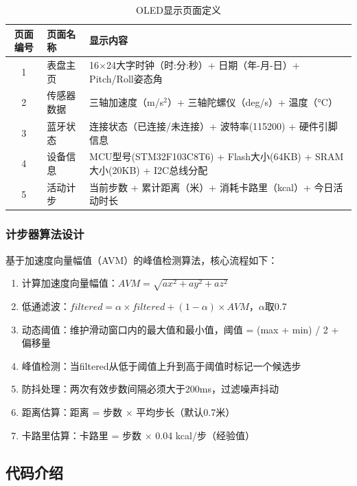 \begin{table}[h]
    \centering
    \caption{OLED显示页面定义}
    \label{tab:pages}
    \begin{tabular}{|c|l|l|}
        \hline
        \textbf{页面编号} & \textbf{页面名称} & \textbf{显示内容} \\ \hline
        1 & 表盘主页 & 16$\times$24大字时钟（时:分:秒）+ 日期（年-月-日）+ Pitch/Roll姿态角 \\ \hline
        2 & 传感器数据 & 三轴加速度（m/s$^2$）+ 三轴陀螺仪（deg/s）+ 温度（°C） \\ \hline
        3 & 蓝牙状态 & 连接状态（已连接/未连接）+ 波特率(115200) + 硬件引脚信息 \\ \hline
        4 & 设备信息 & MCU型号(STM32F103C8T6) + Flash大小(64KB) + SRAM大小(20KB) + I2C总线分配 \\ \hline
        5 & 活动计步 & 当前步数 + 累计距离（米）+ 消耗卡路里（kcal）+ 今日活动时长 \\ \hline
    \end{tabular}
\end{table}

\subsubsection{计步器算法设计}
基于加速度向量幅值（AVM）的峰值检测算法，核心流程如下：
\begin{enumerate}
    \item 计算加速度向量幅值：$AVM = \sqrt{ax^2 + ay^2 + az^2}$
    \item 低通滤波：$filtered = \alpha \times filtered + (1-\alpha) \times AVM$，$\alpha$取0.7
    \item 动态阈值：维护滑动窗口内的最大值和最小值，阈值 = (max + min) / 2 + 偏移量
    \item 峰值检测：当filtered从低于阈值上升到高于阈值时标记一个候选步
    \item 防抖处理：两次有效步数间隔必须大于200ms，过滤噪声抖动
    \item 距离估算：距离 = 步数 $\times$ 平均步长（默认0.7米）
    \item 卡路里估算：卡路里 = 步数 $\times$ 0.04 kcal/步（经验值）
\end{enumerate}

\FloatBarrier

\subsection{代码介绍}

